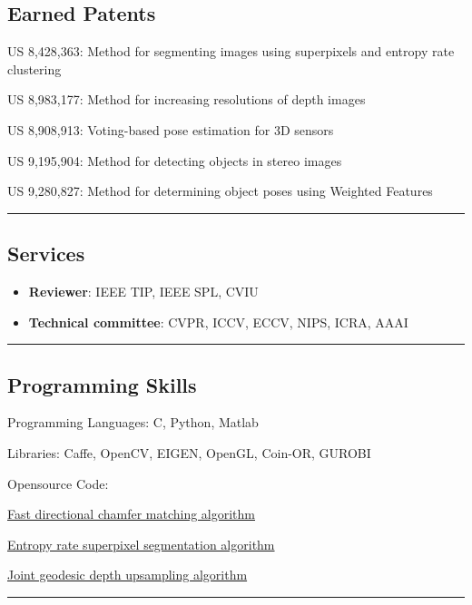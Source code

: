 \documentclass[10pt,letterpaper]{article}
\newenvironment{indentsection}[1]%
{\begin{list}{}%
	{\setlength{\leftmargin}{#1}}%
	\item[]%
}
{\end{list}}
\newcommand{\CPP}
{C\nolinebreak[4]\hspace{-.05em}\raisebox{.22ex}{\footnotesize\bf ++}}
\begin{document}
\subsection*{Earned Patents}
\begin{itemize*}
\item US 8,428,363: Method for segmenting images using superpixels and entropy rate clustering
\item US 8,983,177: Method for increasing resolutions of depth images
\item US 8,908,913: Voting-based pose estimation for 3D sensors
\item US 9,195,904: Method for detecting objects in stereo images
\item US 9,280,827: Method for determining object poses using Weighted Features
\end{itemize*}
\hrule
\vspace{-0.4em}
\subsection*{Services}
\begin{itemize}
\item {\bf Reviewer}: IEEE TIP, IEEE SPL, CVIU
\item {\bf Technical committee}: CVPR, ICCV, ECCV, NIPS, ICRA, AAAI
\end{itemize}
\hrule
\vspace{-0.4em}
\subsection*{Programming Skills}
\begin{indentsection}{\parindent}
\begin{description*}
	\item[Programming Languages:]
	\CPP, Python, Matlab
	\item[Libraries:]
    Caffe, OpenCV, EIGEN, OpenGL, Coin-OR, GUROBI
	\item[Opensource Code:] $\quad$
	\begin{itemize*}
    \item \href{https://github.com/mingyuliutw/fdcm.git}{Fast directional chamfer matching algorithm}
    \item \href{https://github.com/mingyuliutw/ers.git}{Entropy rate superpixel segmentation algorithm}
    \item \href{http://www.merl.com/research/license/}{Joint geodesic depth upsampling algorithm}
  \end{itemize*}
\end{description*}
\end{indentsection}
\hrule
\vspace{-0.4em}
\end{document}
